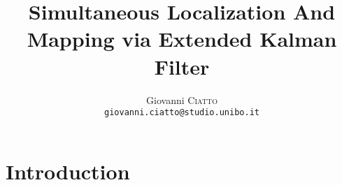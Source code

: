 \documentclass[a4paper,12pt]{article}
\title{\textbf{Simultaneous Localization And Mapping via Extended Kalman Filter}}
\author{
	Giovanni \textsc{Ciatto} \\ \texttt{giovanni.ciatto@studio.unibo.it} \\
}
\begin{document}
	
	\maketitle
	
	\section{Introduction}
		
	
	{}
	
			
\end{document}
